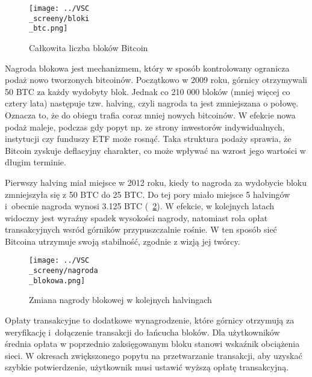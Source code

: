 \documentclass[12pt,a4paper]{report}
\theoremstyle{definition} %
\begin{document}
	\begin{figure}[H]
	    \centering
	    \texttt{[image: ../VSC\\\_screeny/bloki\\\_btc.png]} 
	    \caption{Całkowita liczba bloków Bitcoin}
	    \label{fig:blokiBTC}
	\end{figure}

	Nagroda blokowa jest mechanizmem, który w sposób kontrolowany ogranicza podaż nowo tworzonych bitcoinów. Początkowo w 2009 roku, górnicy otrzymywali 50 BTC za każdy wydobyty blok. Jednak co 210 000 bloków (mniej więcej co cztery lata) następuje tzw. halving, czyli nagroda ta jest zmniejszana o połowę. Oznacza to, że do obiegu trafia coraz mniej nowych bitcoinów. W efekcie nowa podaż maleje, podczas gdy popyt np. ze strony inwestorów indywidualnych, instytucji czy funduszy ETF może rosnąć. Taka struktura podaży sprawia, że Bitcoin zyskuje deflacyjny charakter, co może wpływać na wzrost jego wartości w długim terminie.

	Pierwszy halving miał miejsce w 2012 roku, kiedy to nagroda za wydobycie bloku zmniejszyła się z 50 BTC do 25 BTC. Do tej pory miało miejsce 5 halvingów i~obecnie nagroda wynosi 3.125 BTC (\figurename~\ref{fig:halving}). W efekcie, w kolejnych latach widoczny jest wyraźny spadek wysokości nagrody, natomiast rola opłat transakcyjnych wsród górników przypuszczalnie rośnie. W ten sposób sieć Bitcoina utrzymuje swoją stabilność, zgodnie z wizją jej twórcy.

	\begin{figure}[H]
	    \centering
	    \texttt{[image: ../VSC\\\_screeny/nagroda\\\_blokowa.png]} 
	    \caption{Zmiana nagrody blokowej w kolejnych halvingach}
	    \label{fig:halving}
	\end{figure}

	Opłaty transakcyjne to dodatkowe wynagrodzenie, które górnicy otrzymują za weryfikację i~dołączenie transakcji do łańcucha bloków. Dla użytkowników średnia opłata w poprzednio zaksięgowanym bloku stanowi wskaźnik obciążenia sieci. W okresach zwiększonego popytu na przetwarzanie transakcji, aby uzyskać szybkie potwierdzenie, użytkownik musi ustawić wyższą opłatę transakcyjną.
\end{document}
